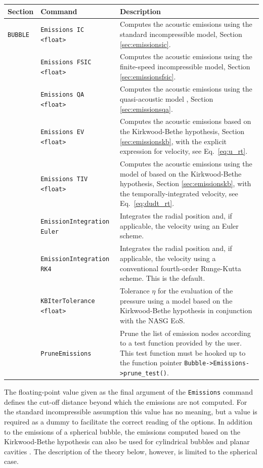 \noindent
\begin{tabular}{p{} p{} p{}}
    \textbf{Section} &\textbf{Command} & \textbf{Description} 
\vspace{1mm} \\ \hline
{\tt BUBBLE} & {\tt Emissions IC <float>} & Computes the acoustic emissions using the standard incompressible model, Section \ref{sec:emissionsic}.\\ 
& {\tt Emissions FSIC <float>} & Computes the acoustic emissions using the finite-speed incompressible model, Section \ref{sec:emissionsfsic}.\\ 
& {\tt Emissions QA <float>} & Computes the acoustic emissions using the quasi-acoustic model \citep{Coulombel2024}, Section \ref{sec:emissionsqa}.\\ 
& {\tt Emissions EV <float>} & Computes the acoustic emissions based on the Kirkwood-Bethe hypothesis, Section \ref{sec:emissionskb}, with the explicit expression for velocity, see Eq.~\eqref{eq:u_rt}.\\ 
& {\tt Emissions TIV <float>} & Computes the acoustic emissions using the model of \citet{Hickling1963} based on the Kirkwood-Bethe hypothesis, Section \ref{sec:emissionskb}, with the temporally-integrated velocity, see Eq.~\eqref{eq:dudt_rt}.\\ 
& {\tt EmissionIntegration Euler} & Integrates the radial position and, if applicable, the velocity using an Euler scheme.\\
& {\tt EmissionIntegration RK4} & Integrates the radial position and, if applicable, the velocity using a conventional fourth-order Runge-Kutta scheme. This is the default.\\
& {\tt KBIterTolerance <float>} & Tolerance $\eta$ for the evaluation of the pressure using a model based on the Kirkwood-Bethe hypothesis in conjunction with the NASG EoS.\\
& {\tt PruneEmissions} & Prune the list of emission nodes according to a test function provided by the user. This test function must  be hooked up to the function pointer {\tt Bubble->Emissions->prune\_test()}.\\
 \hline
\end{tabular} \vspace{0.2em}

The floating-point value given as the final argument of the {\tt Emissions} command defines the cut-off distance beyond which the emissions are not computed. For the standard incompressible assumption this value has no meaning, but a value is required as a dummy to facilitate the correct reading of the options. In addition to the emissions of a spherical bubble, the emissions computed based on the Kirkwood-Bethe hypothesis can also be used for cylindrical bubbles and planar cavities \citep{Denner2024a}. The description of the theory below, however, is limited to the spherical case.

